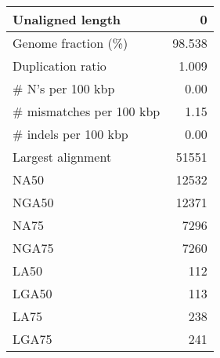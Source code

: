 \documentclass[12pt,a4paper]{article}
\begin{document}
\begin{table}[ht]
\begin{center}
\begin{tabular}{|l*{1}{|r}|}
Unaligned length & 0 \\ \hline
Genome fraction (\%) & 98.538 \\ \hline
Duplication ratio & 1.009 \\ \hline
\# N's per 100 kbp & 0.00 \\ \hline
\# mismatches per 100 kbp & 1.15 \\ \hline
\# indels per 100 kbp & 0.00 \\ \hline
Largest alignment & 51551 \\ \hline
NA50 & 12532 \\ \hline
NGA50 & 12371 \\ \hline
NA75 & 7296 \\ \hline
NGA75 & 7260 \\ \hline
LA50 & 112 \\ \hline
LGA50 & 113 \\ \hline
LA75 & 238 \\ \hline
LGA75 & 241 \\ \hline
\end{tabular}
\end{center}
\end{table}
\end{document}
